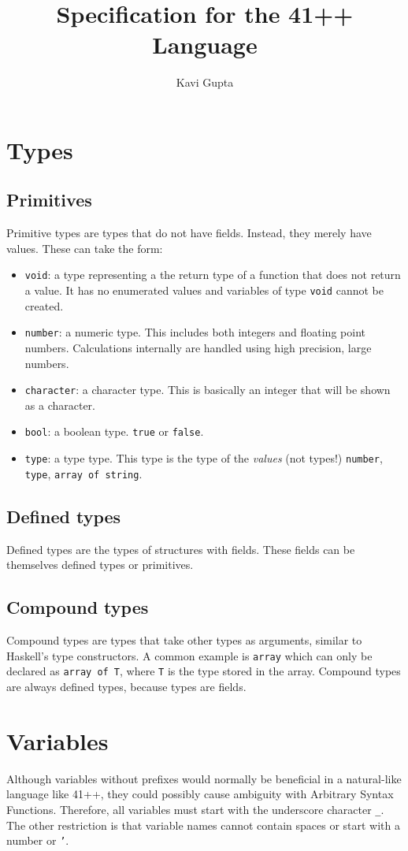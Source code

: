 \documentclass{article}
\newcommand{\code}[1]{\texttt{#1}}
\begin{document}
\title{Specification for the 41++ Language}
\author{Kavi Gupta}
\maketitle
\section{Types}
\subsection{Primitives}
Primitive types are types that do not have fields. Instead, they merely have values. These can take the form:
\begin{itemize}
\item \code{void}: a type representing a the return type of a function that does not return a value. It has no enumerated values and variables of type \code{void} cannot be created.
\item \code{number}: a numeric type. This includes both integers and floating point numbers. Calculations internally are handled using high precision, large numbers.
\item \code{character}: a character type. This is basically an integer that will be shown as a character.
\item \code{bool}: a boolean type. \code{true} or \code{false}.
\item \code{type}: a type type. This type is the type of the \emph{values} (not types!) \code{number}, \code{type}, \code{array of string}.
\end{itemize}
\subsection{Defined types}
Defined types are the types of structures with fields. These fields can be themselves defined types or primitives.
\subsection{Compound types}
Compound types are types that take other types as arguments, similar to Haskell's type constructors. A common example is \code{array} which can only be declared as \code{array of T}, where \code{T} is the type stored in the array. Compound types are always defined types, because types are fields.
\section{Variables}
Although variables without prefixes would normally be beneficial in a natural-like language like 41++, they could possibly cause ambiguity with Arbitrary Syntax Functions. Therefore, all variables must start with the underscore character \code{\_}. The other restriction is that variable names cannot contain spaces or start with a number or \code{'}. 
\end{document}
